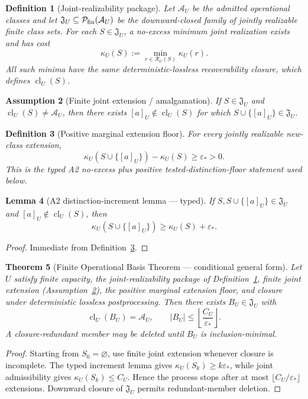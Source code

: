 \documentclass[11pt]{article}
\newtheorem{theorem}{Theorem}[section]
\newtheorem{lemma}[theorem]{Lemma}
\newtheorem{definition}[theorem]{Definition}
\newtheorem{assumption}[theorem]{Assumption}
\theoremstyle{remark}
\newcommand{\Cost}{\kappa}
\newcommand{\floor}{\varepsilon_*}
\begin{document}
\begin{definition}[Joint-realizability package]
\label{def:ts-joint-realizability}
Let $\mathcal A_U$ be the admitted operational classes and let
$\mathfrak J_U\subseteq\mathcal P_{\rm fin}(\mathcal A_U)$ be the downward-closed
family of jointly realizable finite class sets.  For each
$S\in\mathfrak J_U$, a no-excess minimum joint realization exists and has cost
\[
  \kappa_U(S):=\min_{r\in\mathcal R_U(S)}\Cost_U(r).
\]
All such minima have the same deterministic-lossless recoverability closure,
which defines $\operatorname{cl}_U(S)$.
\end{definition}

\begin{assumption}[Finite joint extension / amalgamation]
\label{ass:ts-finite-joint-extension}
If $S\in\mathfrak J_U$ and
$\operatorname{cl}_U(S)\neq\mathcal A_U$, then there exists
$[a]_U\notin\operatorname{cl}_U(S)$ for which
$S\cup\{[a]_U\}\in\mathfrak J_U$.
\end{assumption}

\begin{definition}[Positive marginal extension floor]
\label{def:ts-positive-extension-floor}
For every jointly realizable new-class extension,
\[
  \kappa_U(S\cup\{[a]_U\})-\kappa_U(S)\ge\floor>0.
\]
This is the typed A2 no-excess plus positive tested-distinction-floor statement
used below.
\end{definition}

\begin{lemma}[A2 distinction-increment lemma --- typed]
\label{lem:ts-a2-increment}
If $S,S\cup\{[a]_U\}\in\mathfrak J_U$ and
$[a]_U\notin\operatorname{cl}_U(S)$, then
\[
  \kappa_U(S\cup\{[a]_U\})\ge\kappa_U(S)+\floor.
\]
\end{lemma}
\begin{proof}
Immediate from Definition~\ref{def:ts-positive-extension-floor}.
\end{proof}

\begin{theorem}[Finite Operational Basis Theorem --- conditional general form]
\label{thm:ts-finite-basis}
Let $U$ satisfy finite capacity, the joint-realizability package of
Definition~\ref{def:ts-joint-realizability}, finite joint extension
(Assumption~\ref{ass:ts-finite-joint-extension}), the positive marginal
extension floor, and closure under deterministic lossless postprocessing.  Then
there exists $B_U\in\mathfrak J_U$ with
\[
  \operatorname{cl}_U(B_U)=\mathcal A_U,
  \qquad
  |B_U|\le\left\lfloor\frac{C_U}{\floor}\right\rfloor.
\]
A closure-redundant member may be deleted until $B_U$ is inclusion-minimal.
\end{theorem}
\begin{proof}
Starting from $S_0=\varnothing$, use finite joint extension whenever closure is
incomplete.  The typed increment lemma gives
$\kappa_U(S_k)\ge k\floor$, while joint admissibility gives
$\kappa_U(S_k)\le C_U$.  Hence the process stops after at most
$\lfloor C_U/\floor\rfloor$ extensions.  Downward closure of
$\mathfrak J_U$ permits redundant-member deletion.
\end{proof}
\end{document}
